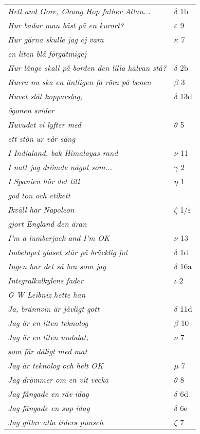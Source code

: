 \documentclass[a6paper,10pt]{article}
\begin{document}
\newpage
\begin{table}[!h]
\begin{tabular}{l l}
\textit{Hell and Gore, Chung Hop father Allan...}	&$\delta$ 1b\\
\textit{Hur badar man bäst på en kurort?}	&$\varepsilon$ 9\\
\textit{Hur gärna skulle jag ej vara}	&$\kappa$ 7\\
\textit{en liten blå förgätmigej} &\\
\textit{Hur länge skall på borden den lilla halvan stå?}	&$\delta$ 2b\\
\textit{Hurra nu ska en äntligen få röra på benen}	&$\beta$ 3\\
\textit{Huvet slåt kopparslag,}	&$\delta$ 13d\\
\textit{ögonen svider} &\\
\textit{Huvudet vi lyfter med}	&$\theta$ 5\\
\textit{ett stön ur vår säng} &\\
\textit{I Indialand, bak Himalayas rand}	&$\nu$ 11\\
\textit{I natt jag drömde något som...}	&$\gamma$ 2\\
\textit{I Spanien hör det till}	&$\eta$ 1\\
\textit{god ton och etikett} &\\
\textit{Ikväll har Napoleon}	&$\zeta$ 1/$\varepsilon$\\
\textit{gjort England den äran} &\\
\textit{I'm a lumberjack and I'm OK}	&$\nu$ 13\\
\textit{Imbelupet glaset står på bräcklig fot}	&$\delta$ 1d\\
\textit{Ingen har det så bra som jag}	&$\delta$ 16a\\
\textit{Integralkalkylens fader}	&$\iota$ 2\\
\textit{G W Leibniz hette han} &\\
\textit{Ja, brännvin är jävligt gott}	&$\delta$ 11d\\
\textit{Jag är en liten teknolog}	&$\beta$ 10\\
\textit{Jag är en liten undulat,}	&$\nu$ 7\\
\textit{som får dåligt med mat} &\\
\textit{Jag är teknolog och helt OK}	&$\mu$ 7\\
\textit{Jag drömmer om en vit vecka}	&$\theta$ 8\\
\textit{Jag fångade en räv idag}	&$\delta$ 6d\\
\textit{Jag fångade en sup idag}	&$\delta$ 6e\\
\textit{Jag gillar alla tiders punsch}	&$\zeta$ 7\\
\end{tabular}
\end{table}
\end{document}
